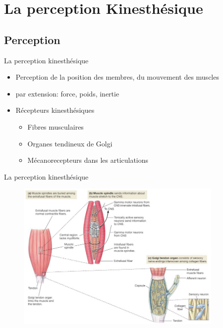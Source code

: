 \section{La perception Kinesthésique}
\subsection{Perception}
\begin{frame}{La perception kinesthésique}

\begin{itemize}
\item Perception de la position des membres, du mouvement des muscles
\item par extension: force, poids, inertie
\end{itemize}

\begin{itemize}
\item Récepteurs kinesthésiques
\begin{itemize}
\item Fibres musculaires
\item Organes tendineux de Golgi
\item Mécanorecepteurs dans les articulations
\end{itemize}
\end{itemize}

\end{frame}

{
\begin{frame}{La perception kinesthésique}
\begin{figure}
\centering
\includegraphics[width=10cm]{images/muscles}
\end{figure}
\end{frame}
}

